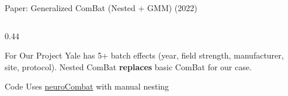 \documentclass[aspectratio=169,xcolor=dvipsnames]{beamer}
\begin{document}
\begin{frame}{Paper: Generalized ComBat (Nested + GMM) (2022)}
\begin{columns}
\begin{column}{0.44\textwidth}
            \begin{alertblock}{For Our Project}
                \small
                Yale has 5+ batch effects (year, field strength, manufacturer, site, protocol). Nested ComBat \textbf{replaces} basic ComBat for our case.
            \end{alertblock}

            \begin{exampleblock}{\scriptsize {} Code}
                \scriptsize Uses \href{https://github.com/Jfortin1/neuroCombat}{neuroCombat} with manual nesting
            \end{exampleblock}
        \end{column}
    \end{columns}
\end{frame}
\end{document}

